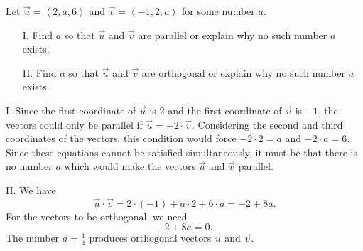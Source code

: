 \documentclass[]{ximera}
\begin{document}
\begin{problem}
Let $\vec{u} = \left<2,a,6\right>$ and $\vec{v} = \left<-1,2,a\right>$ for some number $a$. 
\begin{itemize}
\item[I.] Find $a$ so that $\vec{u}$ and $\vec{v}$ are parallel or explain why no such number $a$ exists.
\item[II.] Find $a$ so that $\vec{u}$ and $\vec{v}$ are orthogonal or explain why no such number $a$ exists.
\end{itemize}

\begin{solution}
I. Since the first coordinate of $\vec{u}$ is $2$ and the first coordinate of $\vec{v}$ is $-1$, the vectors could only be parallel if $\vec{u} = -2 \cdot \vec{v}$. Considering the second and third coordinates of the vectors, this condition would force $-2 \cdot 2 = a$ and $-2 \cdot a = 6$. Since these equations cannot be satisfied simultaneously, it must be that there is no number $a$ which would make the vectors $\vec{u}$ and $\vec{v}$ parallel.

II. We have
$$
\vec{u} \cdot \vec{v} = 2 \cdot (-1) + a \cdot 2 + 6 \cdot a = -2 + 8a.
$$
For the vectors to be orthogonal, we need
$$
-2 + 8 a = 0.
$$
The number $a = \frac{1}{4}$ produces orthogonal vectors $\vec{u}$ and $\vec{v}$. 
\end{solution}
\end{problem}
\end{document}
